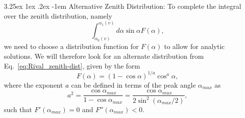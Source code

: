 \documentclass{hitec}
\makeatletter
\numberwithin{equation}{section}
\renewcommand\paragraph{\@startsection{paragraph}{5}{\z@}%
	{3.25ex \@plus1ex \@minus.2ex}%
	{-1em}%
	{\normalfont\normalsize\bfseries}}
\makeatother
\begin{document}
\paragraph{Alternative Zenith Distribution:}
To complete the integral over the zenith distribution, namely
\begin{equation}\label{eq:zenith_integral}
\int_{\alpha_0(v)}^{\alpha_1(v)}d\alpha\sin\alpha F(\alpha),
\end{equation}
we need to choose a distribution function for $F(\alpha)$ to allow for analytic solutions. We will therefore look for an alternate distribution from Eq.\ \eqref{eq:Rival_zenith-dist}, given by the form
\begin{equation}
F(\alpha) = (1-\cos\alpha)^{1/a}\cos^a\alpha,
\end{equation}
where the exponent $a$ can be defined in terms of the peak angle $\alpha_{max}$ as
\begin{equation}\label{eq:a_exponent}
a^2 = \frac{\cos\alpha_{max}}{1-\cos\alpha_{max}} = \frac{\cos\alpha_{max}}{2\sin^2(\alpha_{max}/2)},
\end{equation}
such that $F'(\alpha_{max}) = 0$ and $F''(\alpha_{max}) < 0$.
\end{document}
